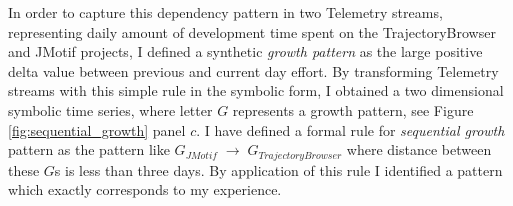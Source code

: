 In order to capture this dependency pattern in two Telemetry streams, representing daily amount of development time spent on the TrajectoryBrowser and JMotif projects, I defined a synthetic \textit{growth pattern} as the large positive delta value between previous and current day effort. By transforming Telemetry streams with this simple rule in the symbolic form, I obtained a two dimensional symbolic time series, where letter $G$ represents a growth pattern, see Figure \ref{fig:sequential_growth} panel $c$. I have defined a formal rule for \textit{sequential growth} pattern as the pattern like $G_{JMotif}\; \rightarrow \; G_{TrajectoryBrowser}$ where distance between these $G$s is less than three days. By application of this rule I identified a pattern which exactly corresponds to my experience.
